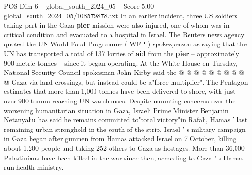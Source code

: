 \begin{textsample}{POS Dim 6 – global\_south\_2024\_05 – Score 5.00 – global\_south\_2024\_05/108579878.txt}
In an earlier incident, three US soldiers taking part in the Gaza \textbf{pier} mission were also injured, one of whom was in critical condition and evacuated to a hospital in Israel.
The Reuters news agency quoted the UN World Food Programme ( WFP ) spokesperson as saying that the UN has transported a total of 137 lorries of \textbf{aid} from the \textbf{pier} -- approximately 900 metric tonnes -- since it began operating.
At the White House on Tuesday, National Security Council spokesman John Kirby said the @ @ @ @ @ @ @ @ @ @ Gaza via land crossings, but instead could be a"force multiplier".
The Pentagon estimates that more than 1,000 tonnes have been delivered to shore, with just over 900 tonnes reaching UN warehouses.
Despite mounting concerns over the worsening humanitarian situation in Gaza, Israeli Prime Minister Benjamin Netanyahu has said he remains committed to"total victory"in Rafah, Hamas ' last remaining urban stronghold in the south of the strip.
Israel ' s military campaign in Gaza began after gunmen from Hamas attacked Israel on 7 October, killing about 1,200 people and taking 252 others to Gaza as hostages.
More than 36,000 Palestinians have been killed in the war since then, according to Gaza ' s Hamas-run health ministry.

\end{textsample}
